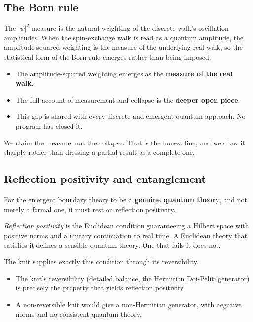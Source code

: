 \subsection{The Born rule}

The $|\psi|^2$ measure is the natural weighting of the discrete walk's oscillation amplitudes. When the spin-exchange walk is read as a quantum amplitude, the amplitude-squared weighting is the measure of the underlying real walk, so the statistical form of the Born rule emerges rather than being imposed.

\begin{itemize}
\item The amplitude-squared weighting emerges as the \textbf{measure of the real walk}.
\item The full account of measurement and collapse is the \textbf{deeper open piece}.
\item This gap is shared with every discrete and emergent-quantum approach. No program has closed it.
\end{itemize}

We claim the measure, not the collapse. That is the honest line, and we draw it sharply rather than dressing a partial result as a complete one.

\subsection{Reflection positivity and entanglement}

For the emergent boundary theory to be a \textbf{genuine quantum theory}, and not merely a formal one, it must rest on reflection positivity.

\begin{definition}
\emph{Reflection positivity} is the Euclidean condition guaranteeing a Hilbert space with positive norms and a unitary continuation to real time. A Euclidean theory that satisfies it defines a sensible quantum theory. One that fails it does not.
\end{definition}

The knit supplies exactly this condition through its reversibility.

\begin{itemize}
\item The knit's reversibility (detailed balance, the Hermitian Doi-Peliti generator) is precisely the property that yields reflection positivity.
\item A non-reversible knit would give a non-Hermitian generator, with negative norms and no consistent quantum theory.
\end{itemize}


